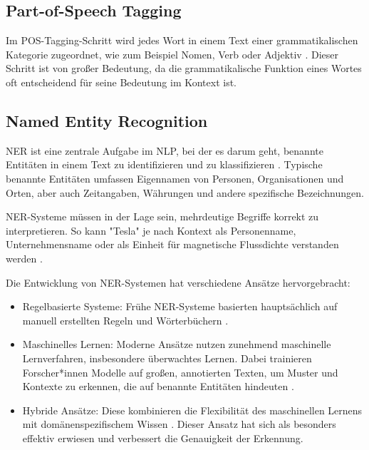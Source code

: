 \subsection{Part-of-Speech Tagging}
\label{subsec:pos-tagging}

Im \gls{POS}-Tagging-Schritt wird jedes Wort in einem Text einer grammatikalischen Kategorie zugeordnet, wie zum Beispiel Nomen, Verb oder Adjektiv \parencite{RebalaGopinath2019AItM}. Dieser Schritt ist von großer Bedeutung, da die grammatikalische Funktion eines Wortes oft entscheidend für seine Bedeutung im Kontext ist.

\subsection{Named Entity Recognition}
\label{subsec:ner}

\gls{NER} ist eine zentrale Aufgabe im \gls{NLP}, bei der es darum geht, benannte Entitäten in einem Text zu identifizieren und zu klassifizieren \parencite{nadeau2007survey}. 
Typische benannte Entitäten umfassen Eigennamen von Personen, Organisationen und Orten, aber auch Zeitangaben, Währungen und andere spezifische Bezeichnungen.

\gls{NER}-Systeme müssen in der Lage sein, mehrdeutige Begriffe korrekt zu interpretieren. So kann "Tesla" je nach Kontext als Personenname, Unternehmensname oder als Einheit für magnetische Flussdichte verstanden werden \parencite{RebalaGopinath2019AItM}.

Die Entwicklung von \gls{NER}-Systemen hat verschiedene Ansätze hervorgebracht:

\begin{itemize}
	\item Regelbasierte Systeme: Frühe \gls{NER}-Systeme basierten hauptsächlich auf manuell erstellten Regeln und Wörterbüchern \parencite{nadeau2007survey}.
	\item Maschinelles Lernen: Moderne Ansätze nutzen zunehmend maschinelle Lernverfahren, insbesondere überwachtes Lernen. Dabei trainieren Forscher*innen Modelle auf großen, annotierten Texten, um Muster und Kontexte zu erkennen, die auf benannte Entitäten hindeuten \parencite{nadeau2007survey}.
	\item Hybride Ansätze: Diese kombinieren die Flexibilität des maschinellen Lernens mit domänenspezifischem Wissen \parencite{nadeau2007survey}. Dieser Ansatz hat sich als besonders effektiv erwiesen und verbessert die Genauigkeit der Erkennung.
\end{itemize}

